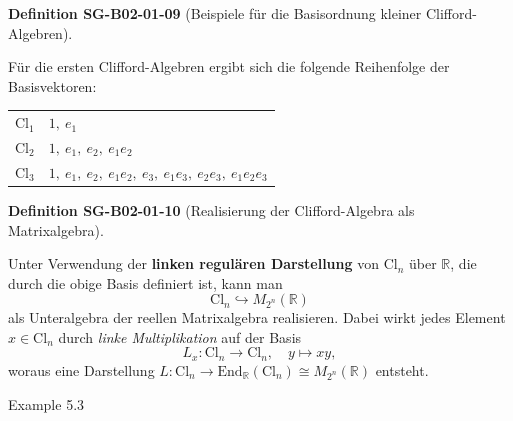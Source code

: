 \documentclass[10pt, letterpaper]{article}
\newcommand{\CustomHeading}[3]{%
  \par\medskip\noindent%
  \textbf{#1 #2} \textnormal{(#3)}.\enskip%
}
\newenvironment{DEF}[2]{\begin{unitbox}\CustomHeading{Definition}{#1}{#2}}{\end{unitbox}}
\begin{document}
\begin{DEF}{SG-B02-01-09}{Beispiele für die Basisordnung kleiner Clifford-Algebren}
Für die ersten Clifford-Algebren ergibt sich die folgende Reihenfolge der Basisvektoren:
\begin{center}
\begin{tabular}{|c|l|}
\hline
$\mathrm{Cl}_1$ & $1,\ e_1$ \\[2pt]
$\mathrm{Cl}_2$ & $1,\ e_1,\ e_2,\ e_1 e_2$ \\[2pt]
$\mathrm{Cl}_3$ & $1,\ e_1,\ e_2,\ e_1 e_2,\ e_3,\ e_1 e_3,\ e_2 e_3,\ e_1 e_2 e_3$ \\
\hline
\end{tabular}
\end{center}
\end{DEF}



\begin{DEF}{SG-B02-01-10}{Realisierung der Clifford-Algebra als Matrixalgebra}
Unter Verwendung der \textbf{linken regulären Darstellung} von $\mathrm{Cl}_n$ über $\mathbb{R}$, die durch die obige Basis definiert ist, kann man
\[
\mathrm{Cl}_n \hookrightarrow M_{2^n}(\mathbb{R})
\]
als Unteralgebra der reellen Matrixalgebra realisieren. Dabei wirkt jedes Element $x \in \mathrm{Cl}_n$ durch \emph{linke Multiplikation} auf der Basis
\[
L_x : \mathrm{Cl}_n \longrightarrow \mathrm{Cl}_n,\quad y \mapsto x y,
\]
woraus eine Darstellung $L : \mathrm{Cl}_n \to \mathrm{End}_{\mathbb{R}}(\mathrm{Cl}_n) \cong M_{2^n}(\mathbb{R})$ entsteht.
\end{DEF}



Example 5.3
\end{document}
